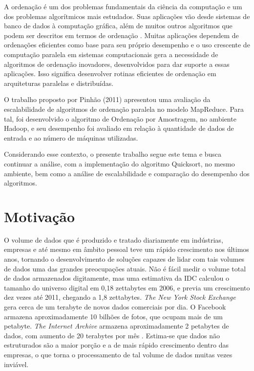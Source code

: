  A ordenação é um dos problemas fundamentais da ciência da computação e um dos problemas algorítmicos mais estudados. Suas aplicações vão desde sistemas de banco de dados à computação gráfica, além de muitos outros algoritmos que podem ser descritos em termos de ordenação \cite{Satish:2009,Amato:1996}.  Muitas aplicações dependem de ordenações eficientes como base para seu próprio desempenho e o uso crescente de computação paralela em sistemas computacionais gera a necessidade de algoritmos de ordenação inovadores, desenvolvidos para dar suporte a essas aplicações. Isso significa desenvolver rotinas eficientes de ordenação em arquiteturas paralelas e distribuídas. 

O trabalho proposto por %
Pinhão (2011) apresentou uma avaliação da escalabilidade de algoritmos de ordenação paralela no modelo MapReduce. Para tal, foi desenvolvido o algoritmo de Ordenação por Amostragem, no ambiente Hadoop, e seu desempenho foi avaliado em relação à quantidade de dados de entrada e ao número de máquinas utilizadas. 

Considerando esse contexto, o presente trabalho segue este tema e busca continuar a análise, com a implementação do algoritmo Quicksort, no mesmo ambiente, bem como a análise de escalabilidade e comparação do desempenho dos algoritmos.


\section{Motivação}


O volume de dados que é produzido e tratado diariamente em indústrias, empresas e até mesmo em âmbito pessoal teve um rápido crescimento nos últimos anos, tornando o desenvolvimento de soluções capazes de lidar com tais volumes de dados uma das grandes preocupações atuais. 
Não é fácil medir o volume total de dados armazenados digitamente, mas uma estimativa da IDC \cite{Gantz:2008} calculou o tamanho do universo digital em 0,18 zettabytes em 2006, e previa um crescimento dez vezes até 2011, chegando a 1,8 zettabytes.
 \textit{The New York Stock Exchange} gera cerca de um terabyte de novos dados comerciais por dia. O Facebook armazena aproximadamente 10 bilhões de fotos, que ocupam mais de um petabyte. \textit{The Internet Archive} armazena aproximadamente 2 petabytes de dados, com aumento de 20 terabytes por mês
\cite{Hadoop:2010}. Estima-se que dados não estruturados são a maior porção e a de mais rápido crescimento dentro das empresas, o que torna o processamento de tal volume de dados muitas vezes inviável.

